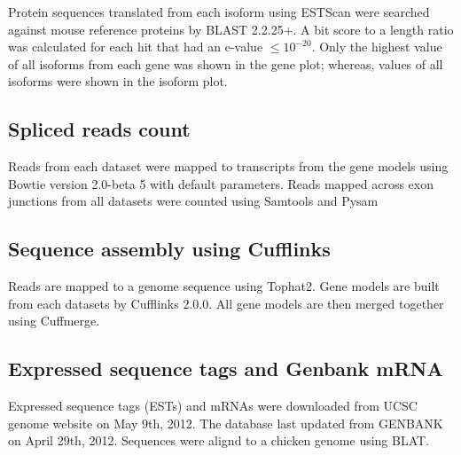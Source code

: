 \documentclass[10pt]{article}
\begin{document}
Protein sequences translated from each isoform using ESTScan were searched against mouse reference proteins by BLAST 2.2.25+\cite{Tatusova:1999tz}.
A bit score to a length ratio was calculated for each hit that had an e-value $\le 10^{-20}$.
Only the highest value of all isoforms from each gene was shown in the gene plot; whereas, values of all isoforms were shown in the isoform plot.

\subsection*{Spliced reads count}

Reads from each dataset were mapped to transcripts from the gene models using Bowtie version 2.0-beta 5 with default parameters.
Reads mapped across exon junctions from all datasets were counted using Samtools\cite{Li:2009vz} and
Pysam\cite{pysam}

\subsection*{Sequence assembly using Cufflinks}
Reads are mapped to a genome sequence using Tophat2.
Gene models are built from each datasets by Cufflinks 2.0.0\cite{Trapnell:2010kd}.
All gene models are then merged together using Cuffmerge.

\subsection*{Expressed sequence tags and Genbank mRNA}
Expressed sequence tags (ESTs) and mRNAs were downloaded from UCSC genome website on May 9th, 2012.
The database last updated from GENBANK on April 29th, 2012.
Sequences were alignd to a chicken genome using BLAT.


\end{document}
